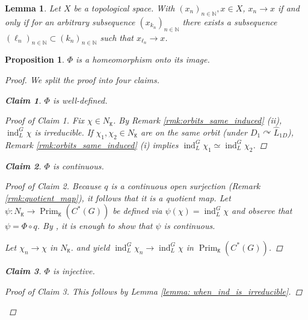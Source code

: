 \documentclass[11pt, twoside]{amsart}
\newcommand{\te}[1]{\operatorname{#1}}
\newcommand{\Prim}{\operatorname{Prim}}
\newcommand{\mt}{\mathtt}
\newcommand{\wh}{\widehat}
\newtheorem{prop}[thm]{Proposition}
\newtheorem{lemma}[thm]{Lemma}
\newtheorem{claim}{Claim}
\theoremstyle{definition}
\newcommand{\B}{\mathbb}
\newcommand{\N}{\B{N}}
\begin{document}
\begin{lemma}\label{lem:convergence_equiv}
  Let $X$ be a topological space. With $(x_n)_{n\in \N},x\in X$, $x_n\to x$ if and only if for an arbitrary subsequence $(x_{k_n})_{n\in \N}$ there exists a subsequence $(\ell_n)_{n\in \N}\subset (k_n)_{n\in \N}$ such that $x_{\ell_n}\to x$.
\end{lemma}

\begin{prop}\label{phi_homeo_onto_image}
$\Phi$ is a homeomorphism onto its image.
\begin{proof}
We split the proof into four claims.

\begin{claim}
$\Phi$ is well-defined. 
\end{claim}

\begin{proof}[Proof of Claim 1]
 Fix $\chi\in N_{\mt{K}}$. By Remark \ref{rmk:orbits_same_induced} (ii), $\te{ind}_L^G\chi$ is irreducible. If $\chi_1,\chi_2\in N_{\mt K}$ are on the same orbit (under $D_1 \curvearrowright \wh{L}_{1D}$), Remark \ref{rmk:orbits_same_induced} (i) implies $\te{ind}_L^G \chi_1\simeq \te{ind}_L^G \chi_2$. \qedhere

 \end{proof}
 
\begin{claim}
$\Phi$ is continuous.
\end{claim}

\begin{proof}[Proof of Claim 2]
Because $q$ is a continuous open surjection (Remark \ref{rmk:quotient_map}), it follows that it is a quotient map. Let $\psi:N_{\mt K}\rightarrow \Prim_{\mt{K}}(C^*(G))$ be defined via $\psi(\chi)=\te{ind}_{L}^G\chi$ and observe that $\psi=\Phi \circ q$. By \cite[Thm 22.2]{Munkres_topology}, it is enough to show that $\psi$ is continuous. \par
         
         Let $\chi_n\to \chi$ in $N_{\mt K}$. \cite[Lemma 4.20]{CW24} and \cite[3.5.8 (p.83)]{Dix77} yield $\te{ind}_L^G\chi_n\to \te{ind}_L^G\chi$ in $\Prim_{\mt{K}}(C^*(G))$. \qedhere
\end{proof}
         
\begin{claim}
$\Phi$ is injective.
\end{claim}

\begin{proof}[Proof of Claim 3]
This follows by Lemma \ref{lemma: when_ind_is_irreducible}. \qedhere
\end{proof}


\end{proof}
\end{prop}
\end{document}
